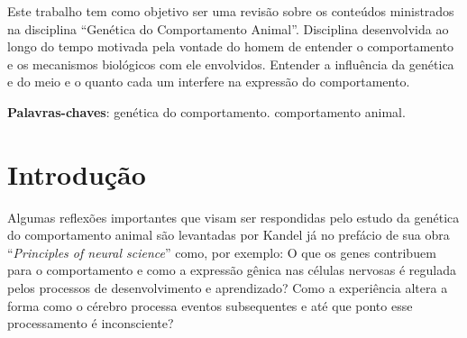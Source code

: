 \documentclass[
	article,			%
	12pt,				%
	oneside,			%
	a4paper,			%
	english,			%
	brazil,				%
	sumario=tradicional
	]{abntex2}
\begin{document}
\frenchspacing 


%
%
\maketitle

\begin{resumoumacoluna}

Este trabalho tem como objetivo ser uma revisão sobre os conteúdos ministrados na disciplina ``Genética do Comportamento Animal''. Disciplina desenvolvida ao longo do tempo motivada pela vontade do homem de entender o comportamento e os mecanismos biológicos com ele envolvidos. Entender a influência da genética e do meio e o quanto cada um interfere na expressão do comportamento.
 
 \vspace{\onelineskip}
 
 \noindent
 \textbf{Palavras-chaves}: genética do comportamento. comportamento animal.
\end{resumoumacoluna}


\textual

\section{Introdução}
\label{intro}
Algumas reflexões importantes que visam ser respondidas pelo estudo da genética do comportamento animal são levantadas por Kandel já no prefácio de sua obra ``\textit{Principles of neural science}'' como, por exemplo: O que os genes contribuem para o comportamento e como a expressão gênica nas células nervosas é regulada pelos processos de desenvolvimento e aprendizado? Como a experiência altera a forma como o cérebro processa eventos subsequentes e até que ponto esse processamento é inconsciente?
\end{document}
